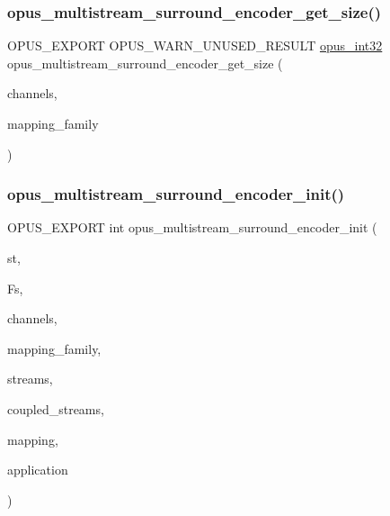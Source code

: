 \subsubsection{\texorpdfstring{opus\_multistream\_surround\_encoder\_get\_size()}{opus\_multistream\_surround\_encoder\_get\_size()}}
{\footnotesize\ttfamily O\+P\+U\+S\+\_\+\+E\+X\+P\+O\+RT O\+P\+U\+S\+\_\+\+W\+A\+R\+N\+\_\+\+U\+N\+U\+S\+E\+D\+\_\+\+R\+E\+S\+U\+LT \mbox{\hyperlink{opus__types_8h_aa4d309d6f80b99dbabebc8f98879ab9a}{opus\+\_\+int32}} opus\+\_\+multistream\+\_\+surround\+\_\+encoder\+\_\+get\+\_\+size (\begin{DoxyParamCaption}\item[{int}]{channels,  }\item[{int}]{mapping\+\_\+family }\end{DoxyParamCaption})}

\mbox{\label{group__opus__multistream_ga786d90cfe8f8b8f371b0137ac76b1559}} 
\subsubsection{\texorpdfstring{opus\_multistream\_surround\_encoder\_init()}{opus\_multistream\_surround\_encoder\_init()}}
{\footnotesize\ttfamily O\+P\+U\+S\+\_\+\+E\+X\+P\+O\+RT int opus\+\_\+multistream\+\_\+surround\+\_\+encoder\+\_\+init (\begin{DoxyParamCaption}\item[{\mbox{\hyperlink{group__opus__multistream_gae5826674d142fc873ebc1d781c507dd7}{Opus\+M\+S\+Encoder}} $\ast$}]{st,  }\item[{\mbox{\hyperlink{opus__types_8h_aa4d309d6f80b99dbabebc8f98879ab9a}{opus\+\_\+int32}}}]{Fs,  }\item[{int}]{channels,  }\item[{int}]{mapping\+\_\+family,  }\item[{int $\ast$}]{streams,  }\item[{int $\ast$}]{coupled\+\_\+streams,  }\item[{unsigned char $\ast$}]{mapping,  }\item[{int}]{application }\end{DoxyParamCaption})}

